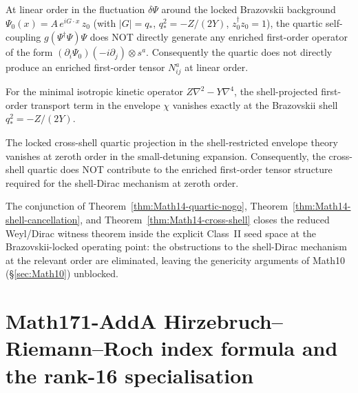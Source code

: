 \begin{theorem}
\label{thm:Math14-quartic-nogo}
At linear order in the fluctuation $\delta\Psi$ around the locked
Brazovskii background $\Psi_0(x) = A\, e^{i G \cdot x}\, z_0$ (with
$|G| = q_*$, $q_*^2 = -Z/(2Y)$, $z_0^\dagger z_0 = 1$), the quartic
self-coupling
$g(\Psi^\dagger \Psi)\Psi$
does NOT directly generate any enriched first-order operator of the
form $(\partial_i \Psi_0)(-i \partial_j) \otimes s^a$. Consequently
the quartic does not directly produce an enriched first-order tensor
$N_{ij}^a$ at linear order.
\end{theorem}

\begin{theorem}
\label{thm:Math14-shell-cancellation}
For the minimal isotropic kinetic operator
$Z\nabla^2 - Y\nabla^4$, the shell-projected first-order transport
term in the envelope $\chi$ vanishes exactly at the Brazovskii shell
$q_*^2 = -Z/(2Y)$.
\end{theorem}

\begin{theorem}
\label{thm:Math14-cross-shell}
The locked cross-shell quartic projection in the shell-restricted
envelope theory vanishes at zeroth order in the small-detuning
expansion. Consequently, the cross-shell quartic does NOT contribute
to the enriched first-order tensor structure required for the
shell-Dirac mechanism at zeroth order.
\end{theorem}

\begin{corollary}
\label{cor:Math14-reduced-witness}
The conjunction of Theorem~\ref{thm:Math14-quartic-nogo},
Theorem~\ref{thm:Math14-shell-cancellation}, and
Theorem~\ref{thm:Math14-cross-shell} closes the reduced Weyl/Dirac
witness theorem inside the explicit Class~II seed space at the
Brazovskii-locked operating point: the obstructions to the
shell-Dirac mechanism at the relevant order are eliminated, leaving
the genericity arguments of Math10 (\S\ref{sec:Math10}) unblocked.
\end{corollary}

\section{Math171-AddA Hirzebruch--Riemann--Roch index formula and
the rank-16 specialisation}\label{sec:Math171-AddA}

